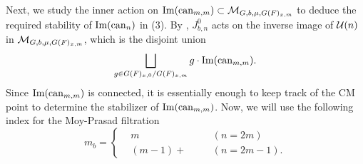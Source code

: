 \documentclass[12pt,reqno]{amsart}
\begin{document}
Next, we study the inner action on ${\operatorname{Im}}({\operatorname{can}}_{m ,m}) \subset {\mathcal{M}}_{G, b, \mu, G(F)_{x, m}}$ to deduce the required stability of ${\operatorname{Im}}({\operatorname{can}}_n)$ in  (3). By , $J_{b, n}^0$ acts on the inverse image of ${\mathcal{U}}(n)$ in ${\mathcal{M}}_{G, b, \mu, G(F)_{x, m}}$, which is the disjoint union 
\begin{equation} \label{eq:inverse_image_U(n)_first}
    \bigsqcup_{g \in G(F)_{x, 0} / G(F)_{x, m}} g \cdot {\operatorname{Im}}({\operatorname{can}}_{m, m}).
\end{equation}
Since ${\operatorname{Im}}({\operatorname{can}}_{m, m})$ is connected, it is essentially enough to keep track of the CM point to determine the stabilizer of ${\operatorname{Im}}({\operatorname{can}}_{m, m})$. Now, we will use the following index for the Moy-Prasad filtration
\[
    m_b = \left\{ \begin{alignedat}{4}
        & m & \quad & (n = 2m) \\
        & (m - 1)+ & \quad & (n = 2m - 1). 
    \end{alignedat}
    \right.
\]
\end{document}

